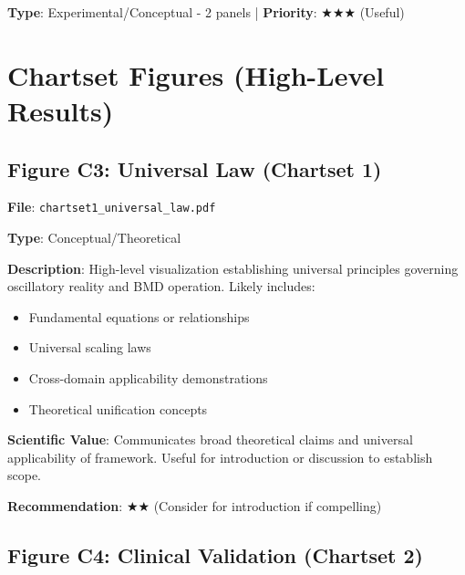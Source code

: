 \documentclass[11pt]{article}
\begin{document}
\textbf{Type}: Experimental/Conceptual - 2 panels | \textbf{Priority}: $\bigstar\bigstar\bigstar$ (Useful)

\newpage

\section{Chartset Figures (High-Level Results)}

\subsection{Figure C3: Universal Law (Chartset 1)}


\textbf{File}: \texttt{chartset1\_universal\_law.pdf}

\textbf{Type}: Conceptual/Theoretical

\textbf{Description}:
High-level visualization establishing universal principles governing oscillatory reality and BMD operation. Likely includes:
\begin{itemize}
\item Fundamental equations or relationships
\item Universal scaling laws
\item Cross-domain applicability demonstrations
\item Theoretical unification concepts
\end{itemize}

\textbf{Scientific Value}:
Communicates broad theoretical claims and universal applicability of framework. Useful for introduction or discussion to establish scope.

\textbf{Recommendation}: $\bigstar\bigstar$ (Consider for introduction if compelling)

\subsection{Figure C4: Clinical Validation (Chartset 2)}
\end{document}
